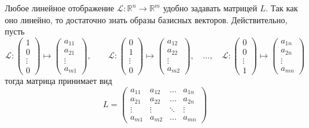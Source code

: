 Любое линейное отображение $\mathscr{L}:\mathbb{R}^n \to \mathbb{R}^m$ удобно задавать матрицей $L$. Так как оно линейно, то достаточно знать образы базисных векторов. Действительно, пусть
\[
 \mathscr{L}: \begin{pmatrix}
     1 \\ 0 \\ \vdots \\ 0
 \end{pmatrix} \mapsto \begin{pmatrix}
     a_{11} \\ a_{21} \\ \vdots\\ a_{m1}
 \end{pmatrix}, \qquad
  \mathscr{L}: \begin{pmatrix}
     0 \\ 1 \\ \vdots \\ 0
 \end{pmatrix} \mapsto \begin{pmatrix}
     a_{12} \\ a_{22} \\ \vdots\\ a_{m2}
 \end{pmatrix}, \quad \ldots, \quad \mathscr{L}: \begin{pmatrix}
     0 \\ 0 \\ \vdots \\ 1
 \end{pmatrix} \mapsto \begin{pmatrix}
     a_{1n} \\ a_{2n} \\ \vdots\\ a_{mn}
 \end{pmatrix}
\]
тогда матрица принимает вид
\[
 L = \begin{pmatrix}
     a_{11} & a_{12} & \ldots & a_{1n} \\
     a_{21} & a_{22} & \ldots & a_{2n} \\
     \vdots & \vdots & \ddots & \vdots \\
     a_{m1} & a_{m2} & \ldots& a_{mn}
 \end{pmatrix}
\]

